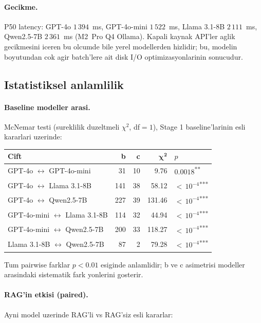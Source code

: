 \documentclass[11pt,a4paper]{article}
\begin{document}
\paragraph{Gecikme.} P50 latency: GPT-4o $1\,394$~ms, GPT-4o-mini
$1\,522$~ms, Llama 3.1-8B $2\,111$~ms, Qwen2.5-7B $2\,361$~ms (M2~Pro Q4
Ollama). Kapali kaynak API'ler aglik gecikmesini iceren bu olcumde bile
yerel modellerden hizlidir; bu, modelin boyutundan cok agir batch'lere ait
disk I/O optimizasyonlarinin sonucudur.

\subsection{Istatistiksel anlamlilik}
\paragraph{Baseline modeller arasi.} McNemar testi (sureklilik duzeltmeli
$\chi^2$, df$=1$), Stage 1 baseline'larinin esli kararlari uzerinde:

\begin{tabularx}{\columnwidth}{X r r r l}
\toprule
\textbf{Cift} & \textbf{b} & \textbf{c} & $\boldsymbol{\chi^2}$ & \textbf{$p$} \\
\midrule
GPT-4o $\leftrightarrow$ GPT-4o-mini       & 31  & 10 & 9.76   & $0.0018$\;\textsuperscript{**} \\
GPT-4o $\leftrightarrow$ Llama 3.1-8B      & 141 & 38 & 58.12  & ${<}\,10^{-4}$\;\textsuperscript{***} \\
GPT-4o $\leftrightarrow$ Qwen2.5-7B        & 227 & 39 & 131.46 & ${<}\,10^{-4}$\;\textsuperscript{***} \\
GPT-4o-mini $\leftrightarrow$ Llama 3.1-8B & 114 & 32 & 44.94  & ${<}\,10^{-4}$\;\textsuperscript{***} \\
GPT-4o-mini $\leftrightarrow$ Qwen2.5-7B   & 200 & 33 & 118.27 & ${<}\,10^{-4}$\;\textsuperscript{***} \\
Llama 3.1-8B $\leftrightarrow$ Qwen2.5-7B  & 87  & 2  & 79.28  & ${<}\,10^{-4}$\;\textsuperscript{***} \\
\bottomrule
\end{tabularx}

\noindent Tum pairwise farklar $p < 0.01$ esiginde anlamlidir; b ve c
asimetrisi modeller arasindaki sistematik fark yonlerini gosterir.

\paragraph{RAG'in etkisi (paired).} Ayni model uzerinde RAG'li vs RAG'siz
esli kararlar:
\end{document}

